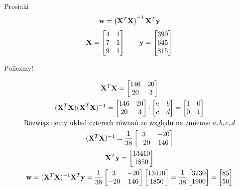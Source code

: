 \documentclass{sa}
\renewcommand{\vec}[1]{\ensuremath\mathbf{#1}}
\begin{document}
\begin{frame}{Prosiaki}
\[\vec{w} = \left(\vec{X}^T\vec{X}\right)^{-1}\vec{X}^T\vec{y}\]
\[
\vec{X} = \begin{bmatrix}
4 & 1\\
7 & 1\\
9 & 1\\
\end{bmatrix}
\qquad
\vec{y}=\begin{bmatrix}
390 \\
645 \\
815 \\
\end{bmatrix}
\]

Policzmy!

{
\begin{gather*}
\vec{X}^T\vec{X}=\begin{bmatrix} 146 & 20 \\ 20 & 3 \end{bmatrix} \\
(\vec{X}^T\vec{X})(\vec{X}^T\vec{X})^{-1}=
\begin{bmatrix} 146 & 20 \\ 20 & 3 \end{bmatrix}\cdot \begin{bmatrix} a & b \\ c & d \end{bmatrix} = \begin{bmatrix} 1 & 0 \\ 0 & 1 \end{bmatrix} \\
\text{Rozwiązujemy układ czterech równań ze względu na zmienne $a, b, c, d$} \\
(\vec{X}^T\vec{X})^{-1}=\frac{1}{38}\begin{bmatrix} 3 & -20 \\ -20 & 146 \end{bmatrix} \\
\vec{X}^T\vec{y}=\begin{bmatrix}13410 \\ 1850 \end{bmatrix} \\
\vec{w}=(\vec{X}^T\vec{X})^{-1}\vec{X}^T\vec{y}=\frac{1}{38}\begin{bmatrix} 3 & -20 \\ -20 & 146 \end{bmatrix}\begin{bmatrix}13410 \\ 1850 \end{bmatrix}=\frac{1}{38}\begin{bmatrix}3230 \\ 1900 \end{bmatrix}=\begin{bmatrix}85 \\ 50 \end{bmatrix}
\end{gather*}
}
\end{frame}
\end{document}
